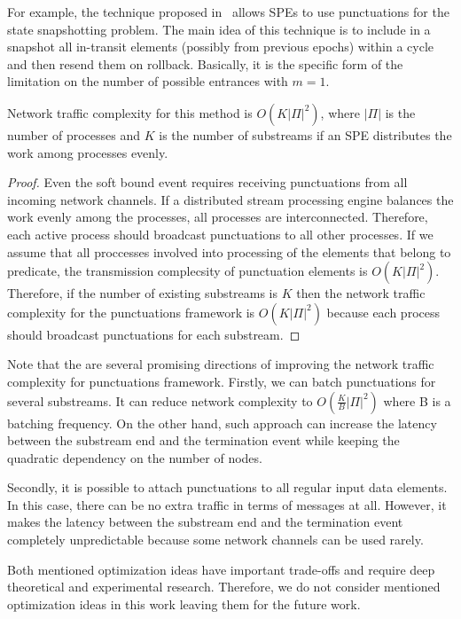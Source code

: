 For example, the technique proposed in~\cite{Carbone:2017:SMA:3137765.3137777} allows SPEs to use punctuations for the state snapshotting problem. The main idea of this technique is to include in a snapshot all in-transit elements (possibly from previous epochs) within a cycle and then resend them on rollback. Basically, it is the specific form of the limitation on the number of possible entrances with $m=1$.

\begin{lemma}
Network traffic complexity for this method is $O(K|\Pi|^2)$, where $|\Pi|$ is the number of processes and $K$ is the number of substreams if an SPE distributes the work among processes evenly.
\end{lemma}
\begin{proof}

Even the soft bound event requires receiving punctuations from all incoming network channels. If a distributed stream processing engine balances the work evenly among the processes, all processes are interconnected. Therefore, each active process should broadcast punctuations to all other processes. If we assume that all proccesses involved into processing of the elements that belong to predicate, the transmission complecsity of punctuation elements is $O(K|\Pi|^2)$. Therefore, if the number of existing substreams is $K$ then the network traffic complexity for the punctuations framework is $O(K|\Pi|^2)$ because each process should broadcast punctuations for each substream. 

\end{proof}

Note that the are several promising directions of improving the network traffic complexity for punctuations framework. Firstly, we can batch punctuations for several substreams. It can reduce network complexity to $O(\frac{K}{B}|\Pi|^2)$ where B is a batching frequency. On the other hand, such approach can increase the latency between the substream end and the termination event while keeping the quadratic dependency on the number of nodes.

Secondly, it is possible to attach punctuations to all regular input data elements. In this case, there can be no extra traffic in terms of messages at all. However, it makes the latency between the substream end and the termination event completely unpredictable because some network channels can be used rarely.

Both mentioned optimization ideas have important trade-offs and require deep theoretical and experimental research. Therefore, we do not consider mentioned optimization ideas in this work leaving them for the future work.